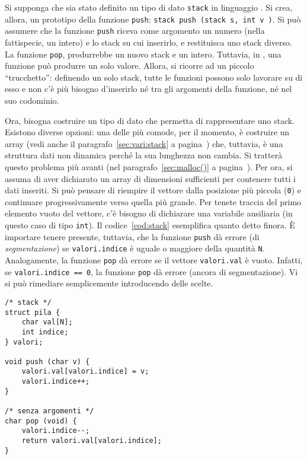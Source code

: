 Si supponga che sia stato definito un tipo di dato \lstinline!stack! in linguaggio .
Si crea, allora, un prototipo della funzione \lstinline!push!: \lstinline!stack push (stack s, int v )!.
Si può assumere che la funzione \lstinline!push! riceva come argomento un numero (nella fattispecie, un intero) e lo stack su cui inserirlo, e restituisca uno stack diverso.
La funzione \lstinline!pop!, produrrebbe un nuovo stack e un intero.
Tuttavia, in , una funzione può produrre un solo valore.
Allora, si ricorre ad un piccolo ``trucchetto'': definendo un solo stack, tutte le funzioni possono solo lavorare su di esso e non c'è più bisogno d'inserirlo né tra gli argomenti della funzione, né nel suo codominio.

Ora, bisogna costruire un tipo di dato che permetta di rappresentare uno stack.
Esistono diverse opzioni: una delle più comode, per il momento, è costruire un array (vedi anche il paragrafo~\ref{sec:vari:stack} a pagina~\pageref{sec:vari:stack}) che, tuttavia, è una struttura dati non dinamica perché la sua lunghezza non cambia.
Si tratterà questo problema più avanti (nel paragrafo~\ref{sec:malloc()} a pagina~\pageref{sec:malloc()}).
Per ora, si assuma di aver dichiarato un array di dimensioni sufficienti per contenere tutti i dati inseriti.
Si può pensare di riempire il vettore dalla posizione più piccola (\lstinline!0!) e continuare progressivamente verso quella più grande.
Per tenete traccia del primo elemento vuoto del vettore, c'è bisogno di dichiarare una variabile ausiliaria (in questo caso di tipo \lstinline!int!).
Il codice~\ref{cod:stack} esemplifica quanto detto finora.
È importare tenere presente, tuttavia, che la funzione \lstinline!push! dà errore (di \emph{segmentazione}) se \lstinline!valori.indice! è uguale o maggiore della quantità \lstinline!N!.
Analogamente, la funzione \lstinline!pop! dà errore se il vettore \lstinline!valori.val! è vuoto.
Infatti, se \lstinline!valori.indice == 0!, la funzione \lstinline!pop! dà errore (ancora di segmentazione).
Vi si può rimediare semplicemente introducendo delle scelte.

\begin{lstlisting}[caption={[{\em Costruzione di uno stack.}]{\em Costruzione di uno stack. In questo esempio s'è usato un record per raggruppare la pila e l'intero che punta al primo elemento vuoto.}}, label={cod:stack}]
/* stack */
struct pila {
	char val[N];
	int indice;
} valori;

void push (char v) {
	valori.val[valori.indice] = v;
	valori.indice++;
}

/* senza argomenti */
char pop (void) {
	valori.indice--;
	return valori.val[valori.indice];
}
\end{lstlisting}

